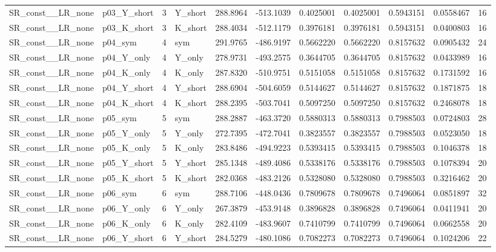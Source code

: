 \begin{table}[!h]
\begin{tabular}[t]{llrlrrrrrrr}
SR\_const\_\_LR\_none & p03\_Y\_short & 3 & Y\_short & 288.8964 & -513.1039 & 0.4025001 & 0.4025001 & 0.5943151 & 0.0558467 & 16\\
SR\_const\_\_LR\_none & p03\_K\_short & 3 & K\_short & 288.4034 & -512.1179 & 0.3976181 & 0.3976181 & 0.5943151 & 0.0400803 & 16\\
\addlinespace
SR\_const\_\_LR\_none & p04\_sym & 4 & sym & 291.9765 & -486.9197 & 0.5662220 & 0.5662220 & 0.8157632 & 0.0905432 & 24\\
SR\_const\_\_LR\_none & p04\_Y\_only & 4 & Y\_only & 278.9731 & -493.2575 & 0.3644705 & 0.3644705 & 0.8157632 & 0.0433989 & 16\\
SR\_const\_\_LR\_none & p04\_K\_only & 4 & K\_only & 287.8320 & -510.9751 & 0.5151058 & 0.5151058 & 0.8157632 & 0.1731592 & 16\\
SR\_const\_\_LR\_none & p04\_Y\_short & 4 & Y\_short & 288.6904 & -504.6059 & 0.5144627 & 0.5144627 & 0.8157632 & 0.1871875 & 18\\
SR\_const\_\_LR\_none & p04\_K\_short & 4 & K\_short & 288.2395 & -503.7041 & 0.5097250 & 0.5097250 & 0.8157632 & 0.2468078 & 18\\
\addlinespace
SR\_const\_\_LR\_none & p05\_sym & 5 & sym & 288.2887 & -463.3720 & 0.5880313 & 0.5880313 & 0.7988503 & 0.0724803 & 28\\
SR\_const\_\_LR\_none & p05\_Y\_only & 5 & Y\_only & 272.7395 & -472.7041 & 0.3823557 & 0.3823557 & 0.7988503 & 0.0523050 & 18\\
SR\_const\_\_LR\_none & p05\_K\_only & 5 & K\_only & 283.8486 & -494.9223 & 0.5393415 & 0.5393415 & 0.7988503 & 0.1046378 & 18\\
SR\_const\_\_LR\_none & p05\_Y\_short & 5 & Y\_short & 285.1348 & -489.4086 & 0.5338176 & 0.5338176 & 0.7988503 & 0.1078394 & 20\\
SR\_const\_\_LR\_none & p05\_K\_short & 5 & K\_short & 282.0368 & -483.2126 & 0.5328080 & 0.5328080 & 0.7988503 & 0.3216462 & 20\\
\addlinespace
SR\_const\_\_LR\_none & p06\_sym & 6 & sym & 288.7106 & -448.0436 & 0.7809678 & 0.7809678 & 0.7496064 & 0.0851897 & 32\\
SR\_const\_\_LR\_none & p06\_Y\_only & 6 & Y\_only & 267.3879 & -453.9148 & 0.3896828 & 0.3896828 & 0.7496064 & 0.0411941 & 20\\
SR\_const\_\_LR\_none & p06\_K\_only & 6 & K\_only & 282.4109 & -483.9607 & 0.7410799 & 0.7410799 & 0.7496064 & 0.0662558 & 20\\
SR\_const\_\_LR\_none & p06\_Y\_short & 6 & Y\_short & 284.5279 & -480.1086 & 0.7082273 & 0.7082273 & 0.7496064 & 0.1024206 & 22\\

\end{tabular}
\end{table}
